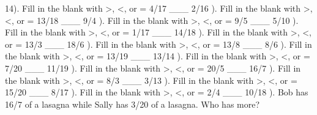 \documentclass{article}%
\begin{document}
14). Fill in the blank with >, <, or = 4/17 \_\_\_ 2/16%
\newline%
\newline%
). Fill in the blank with >, <, or = 13/18 \_\_\_ 9/4%
\newline%
\newline%
). Fill in the blank with >, <, or = 9/5 \_\_\_ 5/10%
\newline%
\newline%
). Fill in the blank with >, <, or = 1/17 \_\_\_ 14/18%
\newline%
\newline%
). Fill in the blank with >, <, or = 13/3 \_\_\_ 18/6%
\newline%
\newline%
). Fill in the blank with >, <, or = 13/8 \_\_\_ 8/6%
\newline%
\newline%
). Fill in the blank with >, <, or = 13/19 \_\_\_ 13/14%
\newline%
\newline%
). Fill in the blank with >, <, or = 7/20 \_\_\_ 11/19%
\newline%
\newline%
). Fill in the blank with >, <, or = 20/5 \_\_\_ 16/7%
\newline%
\newline%
). Fill in the blank with >, <, or = 8/3 \_\_\_ 3/13%
\newline%
\newline%
). Fill in the blank with >, <, or = 15/20 \_\_\_ 8/17%
\newline%
\newline%
). Fill in the blank with >, <, or = 2/4 \_\_\_ 10/18%
\newline%
\newline%
). Bob has 16/7 of a lasagna while Sally has 3/20 of a lasagna. Who has more?%
\newline%
\end{document}
